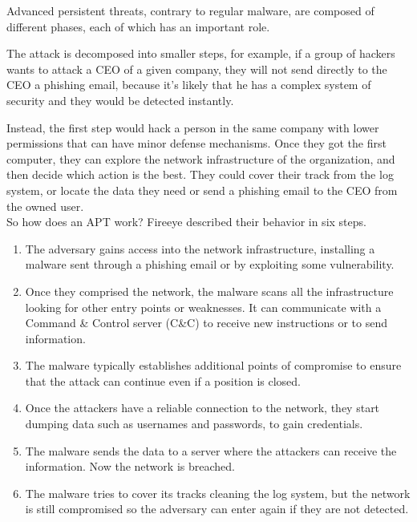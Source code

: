 Advanced persistent threats, contrary to regular malware, are composed of different phases, each of which has an important role. 

The attack is decomposed into smaller steps, for example, if a group of hackers wants to attack a CEO of a given company, they will not send directly to the CEO a phishing email, because it's likely that he has a complex system of security and they would be detected instantly. 

Instead, the first step would hack a person in the same company with lower permissions that can have minor defense mechanisms. Once they got the first computer, they can explore the network infrastructure of the organization, and then decide which action is the best.
They could cover their track from the log system, or locate the data they need or send a phishing email to the CEO from the owned user.\\

So how does an APT work? Fireeye described their behavior in six steps. \cite{fireeye_anatomy}


\begin{enumerate}
	\item The adversary gains access into the network infrastructure, installing a malware sent through a phishing email or by exploiting some vulnerability.
	\item Once they comprised the network, the malware scans all the infrastructure looking for other entry points or weaknesses. It can communicate with a Command \& Control server (C\&C) to receive new instructions or to send information.
	\item The malware typically establishes additional points of compromise to ensure that the attack can continue even if a position is closed.
	\item Once the attackers have a reliable connection to the network, they start dumping data such as usernames and passwords, to gain credentials.
	
	\item The malware sends the data to a server where the attackers can receive the information. Now the network is breached.
	
	\item The malware tries to cover its tracks cleaning the log system, but the network is still compromised so the adversary can enter again if they are not detected.
	
\end{enumerate}